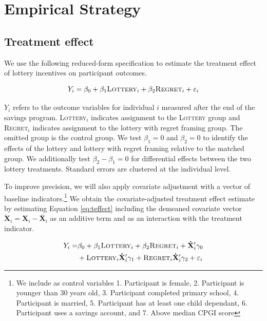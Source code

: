 \documentclass[11pt]{article}
\begin{document}
		\clearpage

\section{Empirical Strategy} \label{sec:est}

	\subsection{Treatment effect}

		We use the following reduced-form specification to estimate the treatment effect of lottery incentives on participant outcomes.

		\begin{equation} \label{eq:teffect}
			Y_{i} = \beta_{0} + \beta_{1}\text{\textsc{Lottery}}_{i} + \beta_{2}\text{\textsc{Regret}}_{i} + \varepsilon_{i}
		\end{equation}

		$Y_{i}$ refers to the outcome variables for individual $i$ measured after the end of the savings program. \textsc{Lottery}$_i$ indicates assignment to the \textsc{Lottery} group and \textsc{Regret}$_i$ indicates assignment to the lottery with regret framing group. The omitted group is the control group. We test $\beta_{1} = 0$ and $\beta_{2} = 0$ to identify the effects of the lottery and lottery with regret framing relative to the matched group. We additionally test $\beta_{2} - \beta_{1} = 0$ for differential effects between the two lottery treatments. Standard errors are clustered at the individual level.

		To improve precision, we will also apply covariate adjustment with a vector of baseline indicators.\footnote{We include as control variables 1. Participant is female, 2. Participant is younger than 30 years old, 3. Participant completed primary school, 4. Participant is married, 5. Participant has at least one child dependant, 6. Participant uses a savings account, and 7. Above median CPGI score} We obtain the covariate-adjusted treatment effect estimate by estimating Equation \ref{eq:teffect} including the demeaned covariate vector $\mathbf{\dot X}_{i} = \mathbf{X}_{i} - \mathbf{\bar X}_{i}$ as an additive term and as an interaction with the treatment indicator.

		\begin{equation} \begin{split} \label{eq:controls}
			Y_{i} = & \beta_{0} + \beta_{1}\text{\textsc{Lottery}}_{i} + \beta_{2}\text{\textsc{Regret}}_{i} + \mathbf{\dot X}'_i \gamma_{0} \\
					& + \text{\textsc{Lottery}}_{i} \mathbf{\dot X}'_i \gamma_{1} + \text{\textsc{Regret}}_{i} \mathbf{\dot X}'_i \gamma_{2} + \varepsilon_{i}
		\end{split} \end{equation}
\end{document}
